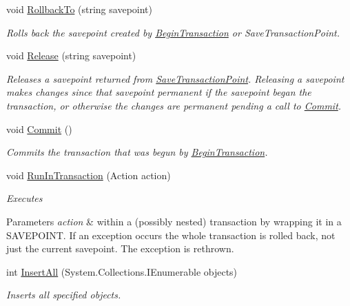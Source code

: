 \begin{DoxyCompactItemize}
void \hyperlink{classSQLite_1_1SQLiteConnection_a94674fbf861328e85a249dd8c14ef6ea}{Rollback\+To} (string savepoint)
\begin{DoxyCompactList}\small\item\em Rolls back the savepoint created by \hyperlink{classSQLite_1_1SQLiteConnection_aba3becdb524808bd49f349587f1b7049}{Begin\+Transaction} or Save\+Transaction\+Point. \end{DoxyCompactList}\item 
void \hyperlink{classSQLite_1_1SQLiteConnection_a6813c9dd152354284ccdc96353bcfbdd}{Release} (string savepoint)
\begin{DoxyCompactList}\small\item\em Releases a savepoint returned from \hyperlink{classSQLite_1_1SQLiteConnection_ab571412a681990a95131ded731ad6c4a}{Save\+Transaction\+Point}. Releasing a savepoint makes changes since that savepoint permanent if the savepoint began the transaction, or otherwise the changes are permanent pending a call to \hyperlink{classSQLite_1_1SQLiteConnection_a2c8187a19b5065f6b23c079e7cca29fe}{Commit}. \end{DoxyCompactList}\item 
void \hyperlink{classSQLite_1_1SQLiteConnection_a2c8187a19b5065f6b23c079e7cca29fe}{Commit} ()
\begin{DoxyCompactList}\small\item\em Commits the transaction that was begun by \hyperlink{classSQLite_1_1SQLiteConnection_aba3becdb524808bd49f349587f1b7049}{Begin\+Transaction}. \end{DoxyCompactList}\item 
void \hyperlink{classSQLite_1_1SQLiteConnection_a9132bae9e577ae479ddc6b919547759f}{Run\+In\+Transaction} (Action action)
\begin{DoxyCompactList}\small\item\em Executes 
\begin{DoxyParams}{Parameters}
{\em action} & within a (possibly nested) transaction by wrapping it in a S\+A\+V\+E\+P\+O\+I\+N\+T. If an exception occurs the whole transaction is rolled back, not just the current savepoint. The exception is rethrown. \\
\hline
\end{DoxyParams}
\end{DoxyCompactList}\item 
int \hyperlink{classSQLite_1_1SQLiteConnection_a920c3f7421ad1c967730228abb5915fc}{Insert\+All} (System.\+Collections.\+I\+Enumerable objects)
\begin{DoxyCompactList}\small\item\em Inserts all specified objects. \end{DoxyCompactList}\item 

\end{DoxyCompactItemize}
